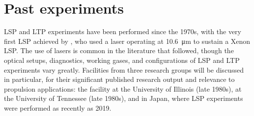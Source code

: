     \section{Past experiments} \label{sec:background_exp}
        LSP and LTP experiments have been performed since the 1970s, with the very first LSP achieved by \textcite{generalovContinuousOpticalDischarge1970}, who used a  laser operating at \qty{10.6}{\um} to sustain a Xenon LSP. The use of  lasers is common in the literature that followed, though the optical setups, diagnostics, working gases, and configurations of LSP and LTP experiments vary greatly. Facilities from three research groups will be discussed in particular, for their significant published research output and relevance to propulsion applications: the facility at the University of Illinois (late 1980s), at the University of Tennessee (late 1980s), and in Japan, where LSP experiments were performed as recently as 2019. 

